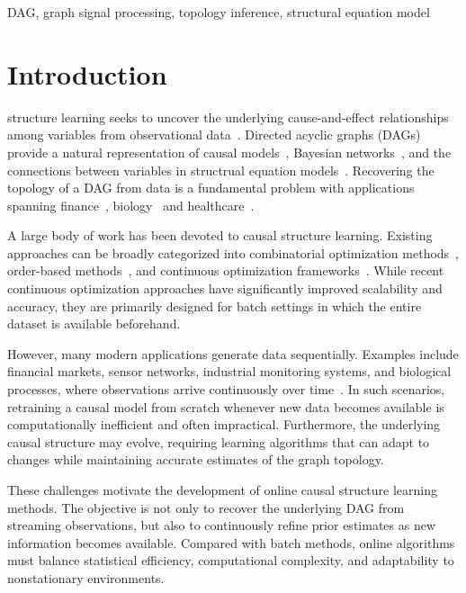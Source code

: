 \documentclass[journal,twoside]{IEEEtran}
\begin{document}
\begin{IEEEkeywords}
DAG, graph signal processing, topology inference, structural equation model
\end{IEEEkeywords}


%
%

\section{Introduction}


 structure learning seeks to uncover the underlying cause-and-effect relationships among variables from observational data~\cite{causationspirtes}. Directed acyclic graphs (DAGs) provide a natural representation of causal models~\cite{peters2017elements}, Bayesian networks~\cite[Ch. 1.2.2]{Pearl_2009}, and the connections between variables in structrual equation models~\cite{loh2014high}. Recovering the topology of a DAG from data is a fundamental problem with applications spanning finance~\cite{finance}, biology~\cite{bio} and healthcare~\cite{lucas2004bayesian}.

A large body of work has been devoted to causal structure learning. Existing approaches can be broadly categorized into combinatorial optimization methods~\cite{chickering2002,ramsey2017}, order-based methods~\cite{topo,permutahedron,two2}, and continuous optimization frameworks~\cite{zheng2018dags,bello2022dagma,saboksayr2023colide}. While recent continuous optimization approaches have significantly improved scalability and accuracy, they are primarily designed for batch settings in which the entire dataset is available beforehand.

However, many modern applications generate data sequentially. Examples include financial markets, sensor networks, industrial monitoring systems, and biological processes, where observations arrive continuously over time~\cite{timeseries}. In such scenarios, retraining a causal model from scratch whenever new data becomes available is computationally inefficient and often impractical. Furthermore, the underlying causal structure may evolve, requiring learning algorithms that can adapt to changes while maintaining accurate estimates of the graph topology.

These challenges motivate the development of online causal structure learning methods. The objective is not only to recover the underlying DAG from streaming observations, but also to continuously refine prior estimates as new information becomes available. Compared with batch methods, online algorithms must balance statistical efficiency, computational complexity, and adaptability to nonstationary environments.
\end{document}
